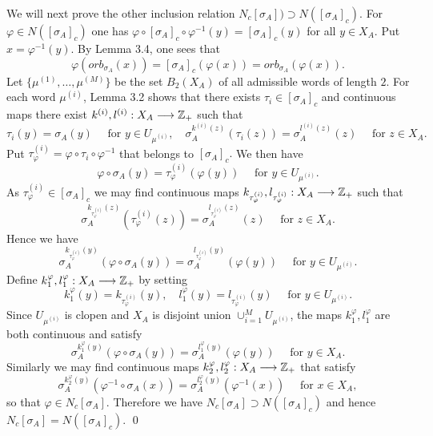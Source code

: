 We will next prove the other inclusion relation 
$N_c[\sigma_A]) \supset N([\sigma_A]_c).$
For $\varphi \in N([\sigma_A]_c)$ 
one has
$\varphi \circ [\sigma_A]_c \circ \varphi^{-1}(y) = [\sigma_A]_c(y)$
for all $y \in X_A$.
Put $x = \varphi^{-1}(y)$.
By Lemma 3.4, one sees that
$$
\varphi(orb_{\sigma_A}(x)) = [\sigma_A]_c(\varphi(x)) = 
 orb_{\sigma_A}(\varphi(x)).
$$
Let
$\{ \mu^{(1)}, \dots, \mu^{(M)} \} $ be the set $B_2(X_A)$
of  all admissible words of length $2$.
For each word $\mu^{(i)}$, Lemma 3.2 shows that there exists
$\tau_i \in [\sigma_A]_c$
and continuous maps
there exist 
$
k^{(i)},l^{(i)} : X_A \longrightarrow { {\Bbb Z}_+ }
$ 
such that
$$
\tau_i(y) = \sigma_A(y) \quad \text{ for } y \in U_{\mu^{(i)}},
\quad
\sigma_A^{k^{(i)}(z)}(\tau_i(z)) = \sigma_A^{l^{(i)}(z)}(z)
\quad \text{ for } z \in X_A.
$$
Put
$
\tau_\varphi^{(i)} = \varphi \circ \tau_i \circ \varphi^{-1}$
that belongs to $[\sigma_A]_c.
$
We then have
$$
\varphi \circ \sigma_A(y) = \tau_\varphi^{(i)} (\varphi(y)) 
\quad \text{ for } y \in U_{\mu^{(i)}}.
$$
As $\tau_\varphi^{(i)} \in [\sigma_A]_c$
we may find continuous maps
$
k_{\tau_\varphi^{(i)}},
 l_{\tau_\varphi^{(i)}} :X_A \longrightarrow { {\Bbb Z}_+ }
$ 
such that
$$
\sigma_A^{k_{\tau_\varphi^{(i)}}(z)}(\tau_\varphi^{(i)}(z)) 
= \sigma_A^{l_{\tau_\varphi^{(i)}}(z)}(z)
\quad \text{ for } z \in X_A.
$$
Hence we have
$$
\sigma_A^{k_{\tau_\varphi^{(i)}}(y)}(\varphi \circ \sigma_A(y))
=\sigma_A^{l_{\tau_\varphi^{(i)}}(y)}(\varphi(y))
\quad \text{ for } y \in U_{\mu^{(i)}}.
$$
Define
$k_1^\varphi, l_1^\varphi : X_A \longrightarrow { {\Bbb Z}_+ }$ by setting
$$
k_1^\varphi(y) = k_{\tau_\varphi^{(i)}}(y),\quad
l_1^\varphi(y) = l_{\tau_\varphi^{(i)}}(y)
\quad
\text{ for } y \in U_{\mu^{(i)}}.
$$
Since
$ U_{\mu^{(i)}}$ 
is clopen and
$X_A $ is disjoint union $ \cup_{i=1}^M U_{\mu^{(i)}}$,
the maps
$k_1^\varphi, l_1^\varphi$
are both continuous and satisfy
$$
\sigma_A^{k_1^\varphi(y)}(\varphi \circ \sigma_A(y))
=\sigma_A^{l_1^\varphi(y)}(\varphi(y))
\quad \text{ for } y \in X_A.
$$
Similarly we may find continuous maps
$k_2^\varphi, l_2^\varphi : X_A \longrightarrow { {\Bbb Z}_+ }$ 
that satisfy
$$
\sigma_A^{k_2^\varphi(y)}(\varphi^{-1} \circ \sigma_A(x))
=\sigma_A^{l_2^\varphi(y)}(\varphi^{-1}(x))
\quad \text{ for } x \in X_A,
$$
so that 
$\varphi \in N_c[\sigma_A]$.
Therefore we have
$N_c [\sigma_A] \supset N([\sigma_A]_c)$
and hence 
$N_c [\sigma_A] = N([\sigma_A]_c)$.
\qed
\enddemo


